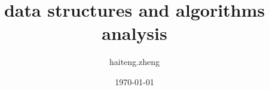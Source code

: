 

\title{data structures and algorithms analysis}
\author{haiteng.zheng}
\date{\today}


\maketitle
\tableofcontents





